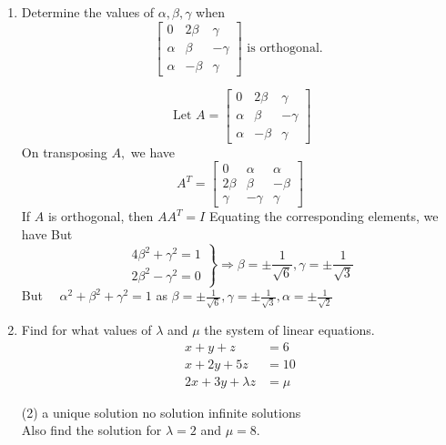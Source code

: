 \begin{enumerate}[label=\color{ocre}\textbf{\arabic*.}]
\begin{answer}
\end{answer} 
\item Determine the values of $\alpha, \beta, \gamma$ when
$$
\left[\begin{array}{rrr}
0 & 2 \beta & \gamma \\
\alpha & \beta & -\gamma \\
\alpha & -\beta & \gamma
\end{array}\right] \text { is orthogonal. }
$$
\begin{answer}
	$$
	\text { Let } A=\left[\begin{array}{rrr}
	0 & 2 \beta & \gamma \\
	\alpha & \beta & -\gamma \\
	\alpha & -\beta & \gamma
	\end{array}\right]
	$$
	On transposing $A,$ we have
	$$
	A^{T}=\left[\begin{array}{rrr}
	0 & \alpha & \alpha \\
	2 \beta & \beta & -\beta \\
	\gamma & -\gamma & \gamma
	\end{array}\right]
	$$
	If $A$ is orthogonal, then $A A^{T}=I$
	Equating the corresponding elements, we have
	But
	$$
	\left.\begin{array}{r}
	4 \beta^{2}+\gamma^{2}=1 \\
	2 \beta^{2}-\gamma^{2}=0
	\end{array}\right\} \Rightarrow \beta=\pm \frac{1}{\sqrt{6}}, \gamma=\pm \frac{1}{\sqrt{3}}
	$$
	But $\quad \alpha^{2}+\beta^{2}+\gamma^{2}=1$ as $\beta=\pm \frac{1}{\sqrt{6}}, \gamma=\pm \frac{1}{\sqrt{3}}, \alpha=\pm \frac{1}{\sqrt{2}}$
\end{answer}
\item Find for what values of $\lambda$ and $\mu$ the system of linear equations.
$$
\begin{aligned}
x+y+z &=6 \\
x+2 y+5 z &=10 \\
2 x+3 y+\lambda z &=\mu
\end{aligned}
$$
\begin{tasks}(2)
	\task[\textbf{a.}] a unique solution  
	\task[\textbf{b.}]no solution
	\task[\textbf{c.}]infinite solutions 
\\Also find the solution for $\lambda=2$ and $\mu=8$.
\end{tasks}
\begin{answer}

\end{answer}
\end{enumerate}
